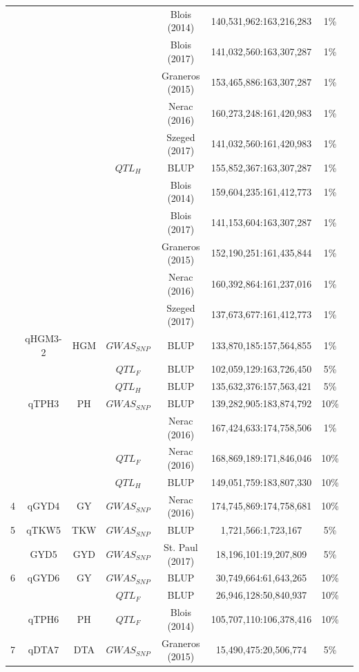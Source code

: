 \documentclass[9pt,twocolumn,twoside]{gsag3jnl}
\begin{document}
\begin{longtable}{c c c c c c c c}
&  & & & Blois (2014) & 140,531,962:163,216,283 & 1\% \\
&  & & & Blois (2017) & 141,032,560:163,307,287 & 1\% \\
&  & & & Graneros (2015) & 153,465,886:163,307,287 & 1\% \\
&  & & & Nerac (2016) & 160,273,248:161,420,983 & 1\% \\
&  & & & Szeged (2017) & 141,032,560:161,420,983 & 1\% \\
&  & & $QTL_H$ & BLUP & 155,852,367:163,307,287 & 1\% \\
&  & & & Blois (2014) & 159,604,235:161,412,773 & 1\% \\
&  & & & Blois (2017) & 141,153,604:163,307,287 & 1\% \\
&  & & & Graneros (2015) & 152,190,251:161,435,844 & 1\% \\
&  & & & Nerac (2016) & 160,392,864:161,237,016 & 1\% \\
&  & & & Szeged (2017) & 137,673,677:161,412,773 & 1\% \\
&  qHGM3-2 & HGM & $GWAS_{SNP}$ & BLUP & 133,870,185:157,564,855 & 1\% \\
&  & & $QTL_F$ & BLUP & 102,059,129:163,726,450 & 5\% \\
&  & & $QTL_H$ & BLUP & 135,632,376:157,563,421 & 5\% \\
&  qTPH3 & PH & $GWAS_{SNP}$ & BLUP & 139,282,905:183,874,792 & 10\% \\
&  & & & Nerac (2016) & 167,424,633:174,758,506 & 1\% \\
&  & & $QTL_F$ & Nerac (2016) & 168,869,189:171,846,046 & 10\% \\
&  & & $QTL_H$ & BLUP & 149,051,759:183,807,330 & 10\% \\
\hline
4  & qGYD4 & GY & $GWAS_{SNP}$ & Nerac (2016) & 174,745,869:174,758,681 & 10\% \\
\hline
5  & qTKW5 & TKW & $GWAS_{SNP}$ & BLUP & 1,721,566:1,723,167 & 5\% \\
& GYD5 & GYD & $GWAS_{SNP}$ & St. Paul (2017) & 18,196,101:19,207,809 & 5\% \\
\hline
6  & qGYD6 & GY & $GWAS_{SNP}$ & BLUP & 30,749,664:61,643,265 & 10\% \\
&  & & $QTL_F$ & BLUP & 26,946,128:50,840,937 & 10\% \\
&  qTPH6 & PH & $QTL_F$ & Blois (2014) & 105,707,110:106,378,416 & 10\% \\
\hline
7  & qDTA7 & DTA & $GWAS_{SNP}$ & Graneros (2015) & 15,490,475:20,506,774 & 5\% \\

\end{longtable}
\end{document}
